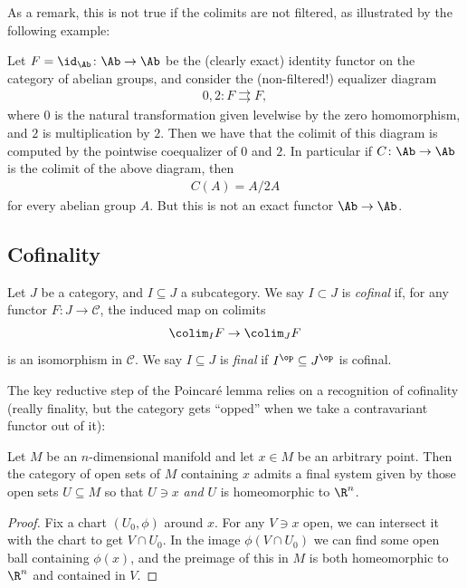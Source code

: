 \documentclass[11pt]{book}
\begin{document}
As a remark, this is not true if the colimits are not filtered, as illustrated by the following example:

\begin{example} Let $F = \id_\Ab \colon \Ab \to \Ab$ be the (clearly exact) identity functor on the category of abelian groups, and consider the (non-filtered!) equalizer diagram
\begin{align*}
    0,2 \colon F \rightrightarrows F,
\end{align*}
where $0$ is the natural transformation given levelwise by the zero homomorphism, and $2$ is multiplication by $2$. Then we have that the colimit of this diagram is computed by the pointwise coequalizer of $0$ and $2$. In particular if $C \colon \Ab \to \Ab$ is the colimit of the above diagram, then
\begin{align*}
    C(A) = A/2A
\end{align*}
for every abelian group $A$. But this is not an exact functor $\Ab \to \Ab$.
\end{example}


\subsection{Cofinality}

\begin{definition}\label{def:cofinal} Let $J$ be a category, and $I \subseteq J$ a subcategory. We say $I \subset J$ is \emph{cofinal} if, for any functor $F \colon J \to \mathscr{C}$, the induced map on colimits
\begin{align*}
    \colim_I F \to \colim_J F
\end{align*}
is an isomorphism in $\mathscr{C}$. We say $I \subseteq J$ is \emph{final} if $I^\op \subseteq J^\op$ is cofinal.
\end{definition}

The key reductive step of the Poincar\'e lemma relies on a recognition of cofinality (really finality, but the category gets ``opped'' when we take a contravariant functor out of it):

\begin{proposition}\label{prop:manifold-stalk-cofinal-system} Let $M$ be an $n$-dimensional manifold and let $x\in M$ be an arbitrary point. Then the category of open sets of $M$ containing $x$ admits a final system given by those open sets $U \subseteq M$ so that $U\ni x$ \emph{and} $U$ is homeomorphic to $\R^n$.
\end{proposition}
\begin{proof} Fix a chart $(U_0,\phi)$ around $x$. For any $V \ni x$ open, we can intersect it with the chart to get $V \cap U_0$. In the image $\phi(V\cap U_0)$ we can find some open ball containing $\phi(x)$, and the preimage of this in $M$ is both homeomorphic to $\R^n$ and contained in $V$.
\end{proof}
\end{document}
